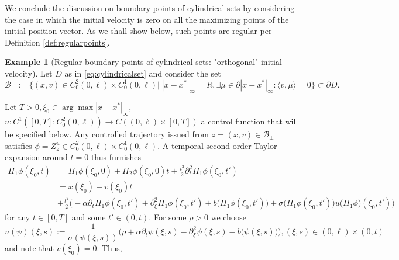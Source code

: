 \documentclass[10pt, reqno]{amsart}
\theoremstyle{definition}
\newtheorem{example}{Example}
\numberwithin{lem}{section}
\numberwithin{cor}{section}
\numberwithin{prop}{section}
\numberwithin{thm}{section}
\numberwithin{dfn}{section}
\begin{document}
We conclude the discussion on boundary points of cylindrical sets by considering the case in which the initial velocity is zero on all the maximizing points of the initial position vector. As we shall show below, such points are regular per Definition \ref{def:regularpoints}.



\begin{example}[Regular boundary points of cylindrical sets: "orthogonal" initial velocity]


 Let $D$ as in \eqref{eq:cylindricalset} and consider the set
 $$\mathcal{B}_{\perp}:=\bigg\{(x,v)\in C^2_0(0,\ell)\times C^1_0(0,\ell)\bigg| \;|x-x^*|_{\infty}=R, \exists\mu\in\partial|x-x^*|_{\infty}:\langle v, \mu\rangle=0\bigg\}\subset \partial D. $$
 
 \noindent Let $T>0, \xi_0\in\arg\max|x-x^*|_{\infty},$  $u: C^1([0,T];C^2_0(0,\ell))\rightarrow C((0,\ell)\times [0,T])$ a control function
 that will be specified below. Any controlled trajectory issued from $z=(x,v)\in \mathcal{B}_{\perp}$ satisfies $\phi=Z^u_z\in C^2_0(0,\ell)\times C^1_0(0,\ell).$ A temporal second-order Taylor expansion around $t=0$ thus furnishes
 \begin{equation*}
 \begin{aligned}
     \Pi_1\phi(\xi_0, t)&=\Pi_1 \phi(\xi_0, 0)+\Pi_2 \phi(\xi_0, 0)t+\frac{t^2}{2}\partial_t^2 \Pi_1 \phi(\xi_0, t')\\&
     = x(\xi_0)+v(\xi_0)t
    \\&+\frac{t^2}{2} \bigg(-\alpha\partial_t\Pi_1\phi(\xi_0,t')+\partial_\xi^2\Pi_1\phi(\xi_0,t')+b\big(\Pi_1\phi(\xi_0, t')\big)+\sigma\big(\Pi_1\phi(\xi_0,t')\big)u\big(\Pi_1\phi\big)(\xi_0,t')\bigg)
 \end{aligned}
 \end{equation*}
 for any $t\in[0,T]$ and some $t'\in (0,t).$ For some $\rho>0$ we choose
 $$u(\psi)(\xi,s):=\frac{1}{\sigma(\psi(\xi,s))}\bigg(\rho+\alpha\partial_t\psi(\xi,s)-\partial_\xi^2\psi(\xi,s)-b\big(\psi(\xi,s)\big)      \bigg), (\xi, s)\in (0,\ell)\times(0, t) $$    
and note  that $v(\xi_0)=0.$ Thus,


\end{example}
\end{document}
